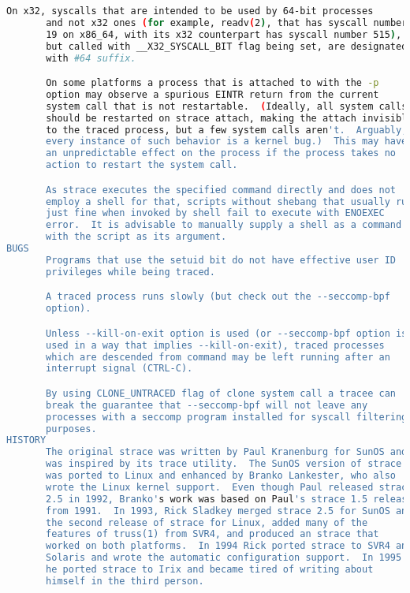{{\begin{lstlisting}[language=bash]
       On x32, syscalls that are intended to be used by 64-bit processes
       and not x32 ones (for example, readv(2), that has syscall number
       19 on x86_64, with its x32 counterpart has syscall number 515),
       but called with __X32_SYSCALL_BIT flag being set, are designated
       with #64 suffix.

       On some platforms a process that is attached to with the -p
       option may observe a spurious EINTR return from the current
       system call that is not restartable.  (Ideally, all system calls
       should be restarted on strace attach, making the attach invisible
       to the traced process, but a few system calls aren't.  Arguably,
       every instance of such behavior is a kernel bug.)  This may have
       an unpredictable effect on the process if the process takes no
       action to restart the system call.

       As strace executes the specified command directly and does not
       employ a shell for that, scripts without shebang that usually run
       just fine when invoked by shell fail to execute with ENOEXEC
       error.  It is advisable to manually supply a shell as a command
       with the script as its argument.
BUGS
       Programs that use the setuid bit do not have effective user ID
       privileges while being traced.

       A traced process runs slowly (but check out the --seccomp-bpf
       option).

       Unless --kill-on-exit option is used (or --seccomp-bpf option is
       used in a way that implies --kill-on-exit), traced processes
       which are descended from command may be left running after an
       interrupt signal (CTRL-C).

       By using CLONE_UNTRACED flag of clone system call a tracee can
       break the guarantee that --seccomp-bpf will not leave any
       processes with a seccomp program installed for syscall filtering
       purposes.
HISTORY
       The original strace was written by Paul Kranenburg for SunOS and
       was inspired by its trace utility.  The SunOS version of strace
       was ported to Linux and enhanced by Branko Lankester, who also
       wrote the Linux kernel support.  Even though Paul released strace
       2.5 in 1992, Branko's work was based on Paul's strace 1.5 release
       from 1991.  In 1993, Rick Sladkey merged strace 2.5 for SunOS and
       the second release of strace for Linux, added many of the
       features of truss(1) from SVR4, and produced an strace that
       worked on both platforms.  In 1994 Rick ported strace to SVR4 and
       Solaris and wrote the automatic configuration support.  In 1995
       he ported strace to Irix and became tired of writing about
       himself in the third person.


\end{lstlisting}}}
